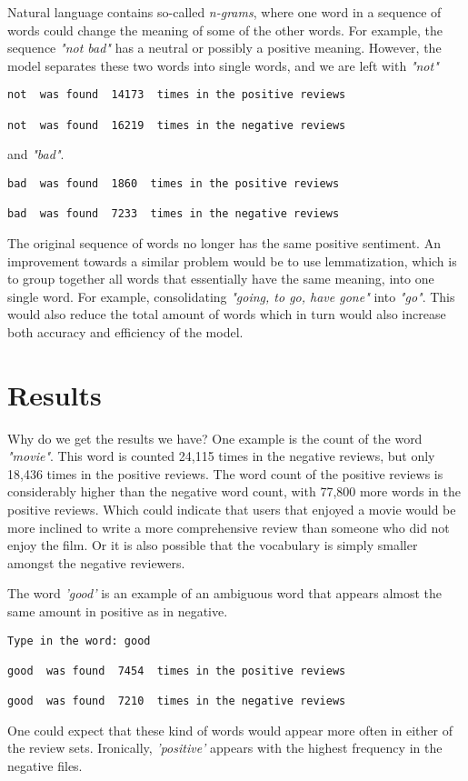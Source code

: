 \documentclass[a4paper,12pt]{article}
\begin{document}
Natural language contains so-called \textit{n-grams}, where one word in a sequence of words could change the meaning of some of the other words. For example, the sequence \textit{"not bad"} has a neutral or possibly a positive meaning. However, the model separates these two words into single words, and we are left with \textit{"not"}
\begin{verbatim}
not  was found  14173  times in the positive reviews

not  was found  16219  times in the negative reviews
\end{verbatim}
and \textit{"bad"}.
\begin{verbatim}
bad  was found  1860  times in the positive reviews

bad  was found  7233  times in the negative reviews
\end{verbatim}
The original sequence of words no longer has the same positive sentiment. An improvement towards a similar problem would be to use lemmatization, which is to group together all words that essentially have the same meaning, into one single word. For example, consolidating \textit{"going, to go, have gone"} into \textit{"go"}. This would also reduce the total amount of words which in turn would also increase both accuracy and efficiency of the model. 

\section{Results}

Why do we get the results we have? One example is the count of the word \textit{"movie"}. This word is counted 24,115 times in the negative reviews, but only 18,436 times in the positive reviews. The word count of the positive reviews is considerably higher than the negative word count, with 77,800 more words in the positive reviews. Which could indicate that users that enjoyed a movie would be more inclined to write a more comprehensive review than someone who did not enjoy the film. Or it is also possible that the vocabulary is simply smaller amongst the negative reviewers.

The word \textit{'good'} is an example of an ambiguous word that appears almost the same amount in positive as in negative.
\begin{verbatim}
Type in the word: good

good  was found  7454  times in the positive reviews

good  was found  7210  times in the negative reviews
\end{verbatim}
One could expect that these kind of words would appear more often in either of the review sets.
Ironically, \textit{'positive'} appears with the highest frequency in the negative files.
\end{document}
